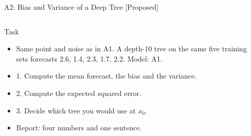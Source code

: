 \begin{frame}{A2: Bias and Variance of a Deep Tree [Proposed]}
\propsub
\itemsize{\scriptsize}
\begin{columns}[T]
\begin{column}{\taskw}
\begin{block}{Task}
\begin{itemize}
    \item Same point and noise as in A1. A depth-10 tree on the same five training sets forecasts 2.6, 1.4, 2.3, 1.7, 2.2. Model: A1.
    \item 1. Compute the mean forecast, the bias and the variance.
    \item 2. Compute the expected squared error.
    \item 3. Decide which tree you would use at $x_0$.
    \item Report: four numbers and one sentence.
\end{itemize}
\end{block}
\end{column}
\begin{column}{\solw}
\end{column}
\end{columns}
\end{frame}

